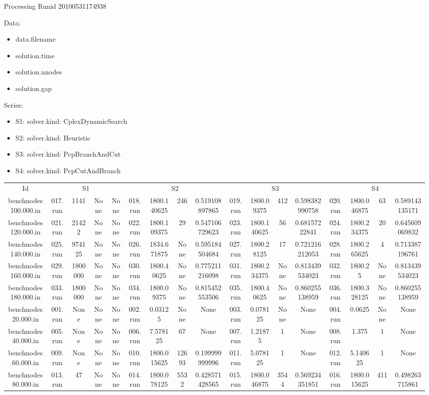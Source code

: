 \documentclass[landscape, 12pt]{report}
\begin{document}
\tiny
Processing Runid 20100531174938
 
 Data:
\begin{itemize}
\item data.filename
\item solution.time
\item solution.nnodes
\item solution.gap
\end{itemize}
Series:
\begin{itemize}
\item S1: solver.kind: CplexDynamicSearch
\item S2: solver.kind: Heuristic
\item S3: solver.kind: PcpBranchAndCut
\item S4: solver.kind: PcpCutAndBranch
\end{itemize}
\begin{tabular}{|c|cccc|cccc|cccc|cccc|}
\multicolumn{1}{|c|}{Id} & \multicolumn{4}{|c|}{S1} & \multicolumn{4}{|c|}{S2} & \multicolumn{4}{|c|}{S3} & \multicolumn{4}{|c|}{S4}
\\
benchnodes100.000.in & 017.run & 1141 & None & None & 018.run & 1800.140625 &  246 & 0.519108897865 & 019.run & 1800.09375 &  412 & 0.598382990758 & 020.run & 1800.046875 &   63 & 0.589143135171
\\
benchnodes120.000.in & 021.run & 21422 & None & None & 022.run & 1800.109375 &   29 & 0.547106729623 & 023.run & 1800.140625 &   56 & 0.68157222841 & 024.run & 1800.234375 &   20 & 0.645609069832
\\
benchnodes140.000.in & 025.run & 974125 & None & None & 026.run & 1834.671875 & None & 0.595184504684 & 027.run & 1800.28125 &   17 & 0.721216212053 & 028.run & 1800.265625 &    4 & 0.713387196761
\\
benchnodes160.000.in & 029.run & 1800000 & None & None & 030.run & 1800.40625 & None & 0.775211216098 & 031.run & 1800.234375 & None & 0.813439534023 & 032.run & 1800.25 & None & 0.813439534023
\\
benchnodes180.000.in & 033.run & 1800000 & None & None & 034.run & 1800.09375 & None & 0.815452553506 & 035.run & 1800.40625 & None & 0.860255138959 & 036.run & 1800.328125 & None & 0.860255138959
\\
benchnodes20.000.in & 001.run & None & None & None & 002.run & 0.03125 & None & None & 003.run & 0.078125 & None & None & 004.run & 0.0625 & None & None
\\
benchnodes40.000.in & 005.run & None & None & None & 006.run & 7.578125 &   67 & None & 007.run & 1.21875 &    1 & None & 008.run & 1.375 &    1 & None
\\
benchnodes60.000.in & 009.run & None & None & None & 010.run & 1800.015625 & 12693 & 0.199999999996 & 011.run & 5.078125 &    1 & None & 012.run & 5.140625 &    1 & None
\\
benchnodes80.000.in & 013.run &   47 & None & None & 014.run & 1800.078125 & 5532 & 0.428571428565 & 015.run & 1800.046875 & 3544 & 0.569234351851 & 016.run & 1800.015625 &  411 & 0.498263715861
\\
\end{tabular}

 
 
 
 
 
\end{document}
